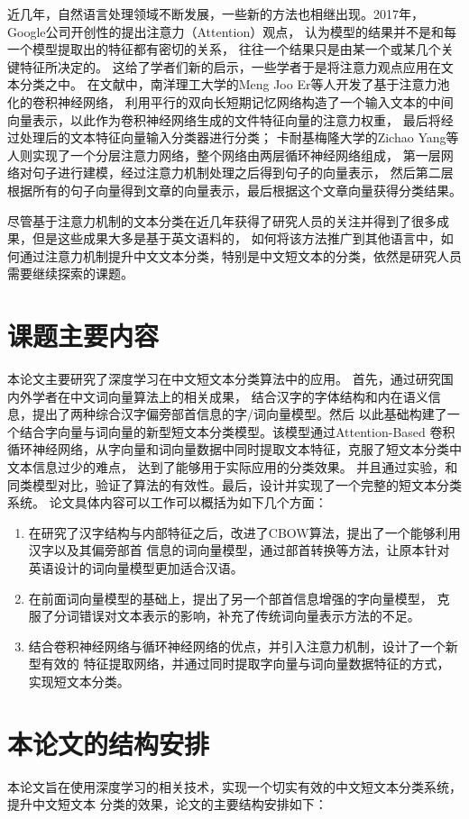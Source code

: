 近几年，自然语言处理领域不断发展，一些新的方法也相继出现。2017年，
Google公司开创性的提出注意力（Attention）观点，
认为模型的结果并不是和每一个模型提取出的特征都有密切的关系，
往往一个结果只是由某一个或某几个关键特征所决定的。
这给了学者们新的启示，一些学者于是将注意力观点应用在文本分类之中。
在文献\cite{er2016attention}中，南洋理工大学的Meng Joo Er等人开发了基于注意力池化的卷积神经网络，
利用平行的双向长短期记忆网络构造了一个输入文本的中间向量表示，以此作为卷积神经网络生成的文件特征向量的注意力权重，
最后将经过处理后的文本特征向量输入分类器进行分类；
卡耐基梅隆大学的Zichao Yang等人则实现了一个分层注意力网络，整个网络由两层循环神经网络组成，
第一层网络对句子进行建模，经过注意力机制处理之后得到句子的向量表示，
然后第二层根据所有的句子向量得到文章的向量表示，最后根据这个文章向量获得分类结果。

尽管基于注意力机制的文本分类在近几年获得了研究人员的关注并得到了很多成果，但是这些成果大多是基于英文语料的，
如何将该方法推广到其他语言中，如何通过注意力机制提升中文文本分类，特别是中文短文本的分类，依然是研究人员需要继续探索的课题。
\section{课题主要内容}
本论文主要研究了深度学习在中文短文本分类算法中的应用。
首先，通过研究国内外学者在中文词向量算法上的相关成果，
结合汉字的字体结构和内在语义信息，提出了两种综合汉字偏旁部首信息的字/词向量模型。然后
以此基础构建了一个结合字向量与词向量的新型短文本分类模型。该模型通过Attention-Based
卷积循环神经网络，从字向量和词向量数据中同时提取文本特征，克服了短文本分类中文本信息过少的难点，
达到了能够用于实际应用的分类效果。
并且通过实验，和同类模型对比，验证了算法的有效性。最后，设计并实现了一个完整的短文本分类系统。
论文具体内容可以工作可以概括为如下几个方面：
\begin{enumerate}
    \item 在研究了汉字结构与内部特征之后，改进了CBOW算法，提出了一个能够利用汉字以及其偏旁部首
    信息的词向量模型，通过部首转换等方法，让原本针对英语设计的词向量模型更加适合汉语。
    \item 在前面词向量模型的基础上，提出了另一个部首信息增强的字向量模型，
    克服了分词错误对文本表示的影响，补充了传统词向量表示方法的不足。
    \item 结合卷积神经网络与循环神经网络的优点，并引入注意力机制，设计了一个新型有效的
    特征提取网络，并通过同时提取字向量与词向量数据特征的方式，实现短文本分类。
\end{enumerate}
\section{本论文的结构安排}
本论文旨在使用深度学习的相关技术，实现一个切实有效的中文短文本分类系统，提升中文短文本
分类的效果，论文的主要结构安排如下：

